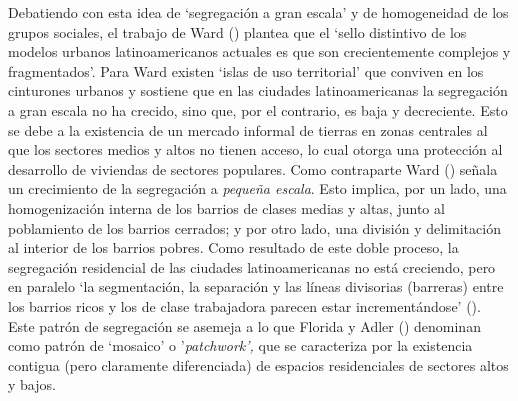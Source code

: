 \documentclass[
  spanish,
  a4paper,%
  chapterprefix=true,%
  DIV=calc,%
  twoside]{scrbook}%
\begin{document}
Debatiendo con esta idea de `segregación a gran escala' y de
homogeneidad de los grupos sociales, el trabajo de Ward ()
plantea que el `sello distintivo de los modelos urbanos latinoamericanos
actuales es que son crecientemente complejos y fragmentados'. Para Ward
existen `islas de uso territorial' que conviven en los cinturones
urbanos y sostiene que en las ciudades latinoamericanas la segregación a
gran escala no ha crecido, sino que, por el contrario, es baja y
decreciente. Esto se debe a la existencia de un mercado informal de
tierras en zonas centrales al que los sectores medios y altos no tienen
acceso, lo cual otorga una protección al desarrollo de viviendas de
sectores populares. Como contraparte Ward () señala un
crecimiento de la segregación a \emph{pequeña escala}. Esto implica, por un
lado, una homogenización interna de los barrios de clases medias y
altas, junto al poblamiento de los barrios cerrados; y por otro lado,
una división y delimitación al interior de los barrios pobres. Como
resultado de este doble proceso, la segregación residencial de las
ciudades latinoamericanas no está creciendo, pero en paralelo `la
segmentación, la separación y las líneas divisorias (barreras) entre los
barrios ricos y los de clase trabajadora parecen estar incrementándose'
().
Este
patrón de segregación se asemeja a lo que Florida y Adler () denominan como
patrón de `mosaico' o '\emph{patchwork',} que se caracteriza por la
existencia contigua (pero claramente diferenciada) de espacios
residenciales de sectores altos y bajos.
\end{document}
